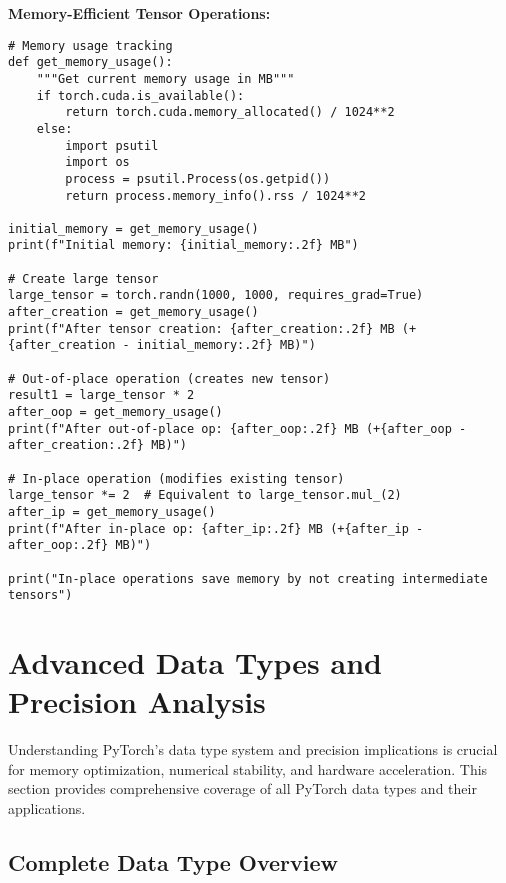 \documentclass[11pt,a4paper]{book}
\begin{document}
\textbf{Memory-Efficient Tensor Operations:}
\begin{verbatim}
# Memory usage tracking
def get_memory_usage():
    """Get current memory usage in MB"""
    if torch.cuda.is_available():
        return torch.cuda.memory_allocated() / 1024**2
    else:
        import psutil
        import os
        process = psutil.Process(os.getpid())
        return process.memory_info().rss / 1024**2

initial_memory = get_memory_usage()
print(f"Initial memory: {initial_memory:.2f} MB")

# Create large tensor
large_tensor = torch.randn(1000, 1000, requires_grad=True)
after_creation = get_memory_usage()
print(f"After tensor creation: {after_creation:.2f} MB (+{after_creation - initial_memory:.2f} MB)")

# Out-of-place operation (creates new tensor)
result1 = large_tensor * 2
after_oop = get_memory_usage()
print(f"After out-of-place op: {after_oop:.2f} MB (+{after_oop - after_creation:.2f} MB)")

# In-place operation (modifies existing tensor)
large_tensor *= 2  # Equivalent to large_tensor.mul_(2)
after_ip = get_memory_usage()
print(f"After in-place op: {after_ip:.2f} MB (+{after_ip - after_oop:.2f} MB)")

print("In-place operations save memory by not creating intermediate tensors")
\end{verbatim}

\section{Advanced Data Types and Precision Analysis}

\begin{keybox}
Understanding PyTorch's data type system and precision implications is crucial for memory optimization, numerical stability, and hardware acceleration. This section provides comprehensive coverage of all PyTorch data types and their applications.
\end{keybox}

\subsection{Complete Data Type Overview}
\end{document}
